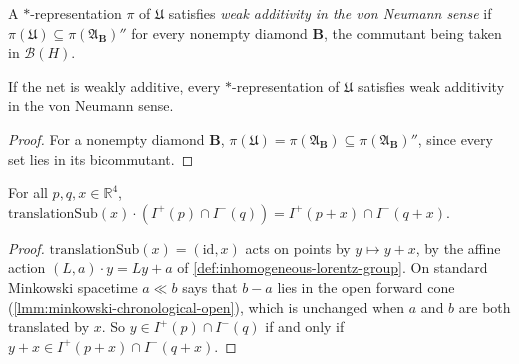 \begin{definition}
    \label{def:weak-additivity-von-neumann}
    \leanok
    A $*$-representation $\pi$ of $\mathfrak{U}$ satisfies \emph{weak additivity in the von Neumann sense} if $\pi(\mathfrak{U}) \subseteq \pi(\mathfrak{A}_{\mathbf{B}})''$ for every nonempty diamond $\mathbf{B}$, the commutant being taken in $\mathcal{B}(H)$.
\end{definition}

\begin{lemma}
    \label{lmm:weak-additivity-von-neumann}
    \leanok
    If the net is weakly additive, every $*$-representation of $\mathfrak{U}$ satisfies weak additivity in the von Neumann sense.
\end{lemma}
\begin{proof}
    \leanok
    For a nonempty diamond $\mathbf{B}$, $\pi(\mathfrak{U}) = \pi(\mathfrak{A}_{\mathbf{B}}) \subseteq \pi(\mathfrak{A}_{\mathbf{B}})''$, since every set lies in its bicommutant.
\end{proof}

\begin{lemma}
    \label{lmm:diamond-translate}
    \leanok
    For all $p, q, x \in \mathbb{R}^4$, $\mathrm{translationSub}(x) \cdot (I^+(p) \cap I^-(q)) = I^+(p + x) \cap I^-(q + x)$.
\end{lemma}
\begin{proof}
    \leanok
    $\mathrm{translationSub}(x) = (\mathrm{id}, x)$ acts on points by $y \mapsto y + x$, by the affine action $(L, a) \cdot y = Ly + a$ of \ref{def:inhomogeneous-lorentz-group}. On standard Minkowski spacetime $a \ll b$ says that $b - a$ lies in the open forward cone (\ref{lmm:minkowski-chronological-open}), which is unchanged when $a$ and $b$ are both translated by $x$. So $y \in I^+(p) \cap I^-(q)$ if and only if $y + x \in I^+(p + x) \cap I^-(q + x)$.
\end{proof}

